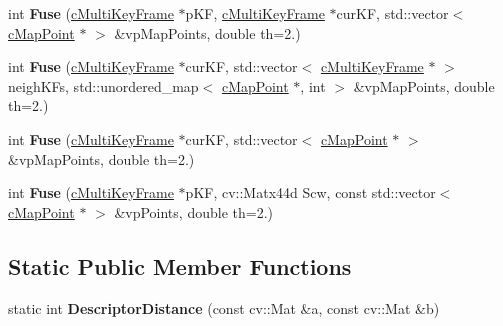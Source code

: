 \begin{DoxyCompactItemize}
\item 
int {\bfseries Fuse} (\hyperlink{classMultiColSLAM_1_1cMultiKeyFrame}{c\+Multi\+Key\+Frame} $\ast$p\+KF, \hyperlink{classMultiColSLAM_1_1cMultiKeyFrame}{c\+Multi\+Key\+Frame} $\ast$cur\+KF, std\+::vector$<$ \hyperlink{classMultiColSLAM_1_1cMapPoint}{c\+Map\+Point} $\ast$ $>$ \&vp\+Map\+Points, double th=2.)\hypertarget{classMultiColSLAM_1_1cORBmatcher_a849cf6f73f94dca42adf093dd248afc8}{}\label{classMultiColSLAM_1_1cORBmatcher_a849cf6f73f94dca42adf093dd248afc8}

\item 
int {\bfseries Fuse} (\hyperlink{classMultiColSLAM_1_1cMultiKeyFrame}{c\+Multi\+Key\+Frame} $\ast$cur\+KF, std\+::vector$<$ \hyperlink{classMultiColSLAM_1_1cMultiKeyFrame}{c\+Multi\+Key\+Frame} $\ast$ $>$ neigh\+K\+Fs, std\+::unordered\+\_\+map$<$ \hyperlink{classMultiColSLAM_1_1cMapPoint}{c\+Map\+Point} $\ast$, int $>$ \&vp\+Map\+Points, double th=2.)\hypertarget{classMultiColSLAM_1_1cORBmatcher_aed38e7b3eb5e1523e216d769f0e0a23a}{}\label{classMultiColSLAM_1_1cORBmatcher_aed38e7b3eb5e1523e216d769f0e0a23a}

\item 
int {\bfseries Fuse} (\hyperlink{classMultiColSLAM_1_1cMultiKeyFrame}{c\+Multi\+Key\+Frame} $\ast$cur\+KF, std\+::vector$<$ \hyperlink{classMultiColSLAM_1_1cMapPoint}{c\+Map\+Point} $\ast$ $>$ \&vp\+Map\+Points, double th=2.)\hypertarget{classMultiColSLAM_1_1cORBmatcher_acb6a0ab61d5b49d37310ff615e279aa7}{}\label{classMultiColSLAM_1_1cORBmatcher_acb6a0ab61d5b49d37310ff615e279aa7}

\item 
int {\bfseries Fuse} (\hyperlink{classMultiColSLAM_1_1cMultiKeyFrame}{c\+Multi\+Key\+Frame} $\ast$p\+KF, cv\+::\+Matx44d Scw, const std\+::vector$<$ \hyperlink{classMultiColSLAM_1_1cMapPoint}{c\+Map\+Point} $\ast$ $>$ \&vp\+Points, double th=2.)\hypertarget{classMultiColSLAM_1_1cORBmatcher_ab56a9c77bd5abb1a34f54e9d3c8de834}{}\label{classMultiColSLAM_1_1cORBmatcher_ab56a9c77bd5abb1a34f54e9d3c8de834}

\end{DoxyCompactItemize}
\subsection*{Static Public Member Functions}
\begin{DoxyCompactItemize}
\item 
static int {\bfseries Descriptor\+Distance} (const cv\+::\+Mat \&a, const cv\+::\+Mat \&b)\hypertarget{classMultiColSLAM_1_1cORBmatcher_afbb58ae37fa48deedad44d01d8f3f36f}{}\label{classMultiColSLAM_1_1cORBmatcher_afbb58ae37fa48deedad44d01d8f3f36f}

\end{DoxyCompactItemize}
